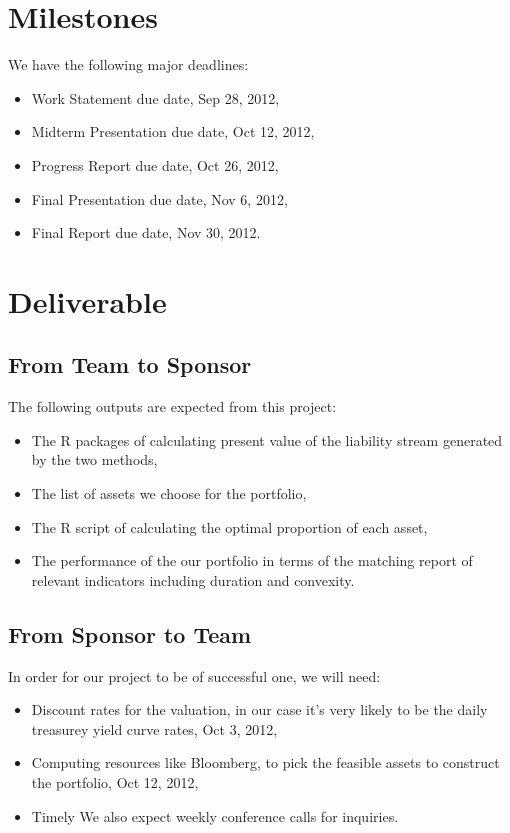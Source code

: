 \documentclass[12pt,letterpaper]{article}
\theoremstyle{definition}
\begin{document}
\section{Milestones}
We have the following major deadlines:
\begin{itemize}
    \item Work Statement due date, Sep 28, 2012,
    \item Midterm Presentation due date, Oct 12, 2012,
    \item Progress Report due date, Oct 26, 2012,
    \item Final Presentation due date, Nov 6, 2012,
    \item Final Report due date, Nov 30, 2012.
\end{itemize}

\section{Deliverable}
\subsection{From Team to Sponsor} %
The following outputs are expected from this project:
\begin{itemize}
    \item The R packages of calculating present value of the liability stream generated by the two methods,
    \item The list of assets we choose for the portfolio,
    \item The R script of calculating the optimal proportion of each asset,
    \item The performance of the our portfolio in terms of the matching report of relevant indicators including duration and convexity.
\end{itemize}

\subsection{From Sponsor to Team} %

In order for our project to be of successful one, we will need:
\begin{itemize}
    \item Discount rates for the valuation, in our case it's very likely to be the daily treasurey yield curve rates,  Oct 3, 2012,
    \item Computing resources like Bloomberg, to pick the feasible assets to construct the portfolio, Oct 12, 2012,
    \item Timely We also expect weekly conference calls for inquiries.
\end{itemize}
\end{document}
